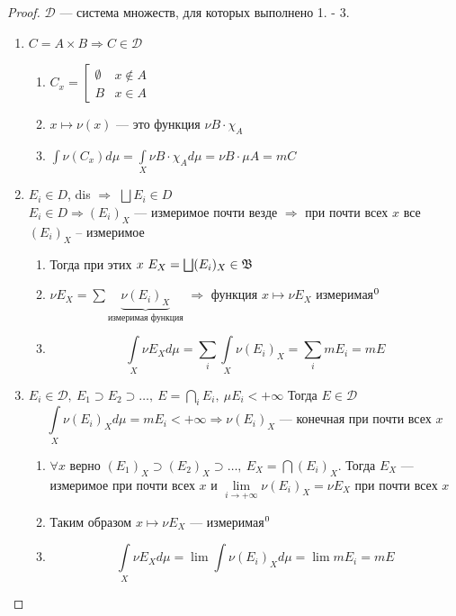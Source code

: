 \documentclass[oneside]{book}
\theoremstyle{plain}
\theoremstyle{remark}
\theoremstyle{definition}
\begin{document}
\begin{proof}
\(\mathcal{D}\) --- система множеств, для которых выполнено 1. - 3. 
\begin{enumerate}
\item \(C = A\times B \Rightarrow C \in \mathcal{D}\)
\begin{enumerate}
\item \(C_x = \left[\begin{matrix} \emptyset & x \not\in A \\ B & x \in A\end{matrix}\right.\)
\item \(x \mapsto \nu(x)\) --- это функция \(\nu B \cdot \chi_A\)
\item \(\int \nu(C_x) d\mu = \int\limits_X \nu B \cdot \chi_A d\mu = \nu B \cdot \mu A = mC\)
\end{enumerate}
\item \(E_i \in D\), dis \(\Rightarrow\) \(\bigsqcup E_i \in D\) \\
\(E_i \in D \Rightarrow (E_i)_X\) --- измеримое почти везде \(\Rightarrow\) при почти всех \(x\) все \((E_i)_X\) -- измеримое \\
\begin{enumerate}
\item Тогда при этих \(x\ E_X = \bigsqcup(E_i)_X \in \mathfrak{B}\)
\item \(\nu E_X = \sum \underbrace{\nu(E_i)_X}_\text{измеримая функция}\) \(\Rightarrow\) функция \(x \mapsto \nu E_X\) измеримая\(\footnotemark[\value{footnote}]\)
\item \[ \int\limits_X \nu E_X d\mu = \sum_i \int\limits_X \nu(E_i)_X = \sum_i mE_i = mE \]
\end{enumerate}
\item \(E_i \in \mathcal{D},\ E_1 \supset E_2 \supset \dots,\ E = \bigcap\limits_iE_i,\ \mu E_i < + \infty\) Тогда \(E \in \mathcal{D}\)
\[ \int\limits_X \nu(E_i)_X d\mu = mE_i < +\infty \Rightarrow \nu(E_i)_X\text{ --- конечная при почти всех }x \]
\begin{enumerate}
\item \(\forall x\) верно \((E_1)_X \supset (E_2)_X \supset \dots ,\ E_X = \bigcap (E_i)_X\). Тогда \(E_X\) --- измеримое при почти всех \(x\) и \(\lim\limits_{i \to + \infty} \nu(E_i)_X = \nu E_X\) при почти всех \(x\)
\item Таким образом \(x \mapsto \nu E_X\) --- измеримая\(\footnotemark[\value{footnote}]\)
\item \[ \int\limits_X \nu E_X d\mu = \lim \int \nu(E_i)_X d\mu = \lim mE_i = mE \]

\end{enumerate}
\end{enumerate}
\end{proof}
\end{document}
